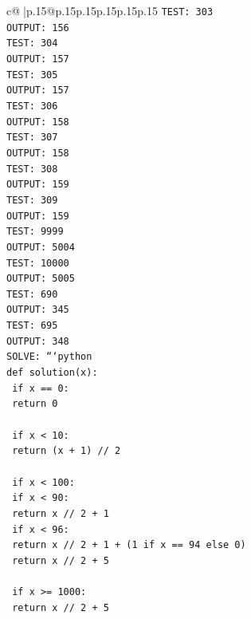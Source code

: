 \documentclass{article}
\begin{document}
{\begin{supertabular}{c@{$\;$}|p{.15\linewidth}@{}p{.15\linewidth}p{.15\linewidth}p{.15\linewidth}p{.15\linewidth}p{.15\linewidth}}
{{{\texttt{TEST: 303} \\
\texttt{OUTPUT: 156} \\
\texttt{TEST: 304} \\
\texttt{OUTPUT: 157} \\
\texttt{TEST: 305} \\
\texttt{OUTPUT: 157} \\
\texttt{TEST: 306} \\
\texttt{OUTPUT: 158} \\
\texttt{TEST: 307} \\
\texttt{OUTPUT: 158} \\
\texttt{TEST: 308} \\
\texttt{OUTPUT: 159} \\
\texttt{TEST: 309} \\
\texttt{OUTPUT: 159} \\
\texttt{TEST: 9999} \\
\texttt{OUTPUT: 5004} \\
\texttt{TEST: 10000} \\
\texttt{OUTPUT: 5005} \\
\texttt{TEST: 690} \\
\texttt{OUTPUT: 345} \\
\texttt{TEST: 695} \\
\texttt{OUTPUT: 348} \\
\texttt{SOLVE: ```python} \\
\texttt{def solution(x):} \\
\texttt{    if x == 0:} \\
\texttt{        return 0} \\
\\ 
\texttt{    if x < 10:} \\
\texttt{        return (x + 1) // 2} \\
\\ 
\texttt{    if x < 100:} \\
\texttt{        if x < 90:} \\
\texttt{            return x // 2 + 1} \\
\texttt{        if x < 96:} \\
\texttt{            return x // 2 + 1 + (1 if x == 94 else 0)} \\
\texttt{        return x // 2 + 5} \\
\\ 
\texttt{    if x >= 1000:} \\
\texttt{        return x // 2 + 5} \\
\\ 
}}}
\end{supertabular}}
\end{document}
